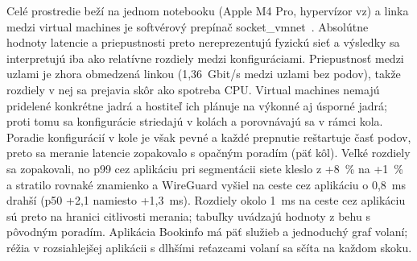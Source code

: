Celé prostredie beží na jednom notebooku (Apple M4 Pro, hypervízor vz) a linka medzi virtual machines je softvérový prepínač socket\_vmnet~\cite{socket-vmnet}. Absolútne hodnoty latencie a priepustnosti preto nereprezentujú fyzickú sieť a výsledky sa interpretujú iba ako relatívne rozdiely medzi konfiguráciami. Priepustnosť medzi uzlami je zhora obmedzená linkou (1,36~Gbit/s medzi uzlami bez podov), takže rozdiely v nej sa prejavia skôr ako spotreba CPU. Virtual machines nemajú pridelené konkrétne jadrá a hostiteľ ich plánuje na výkonné aj úsporné jadrá; proti tomu sa konfigurácie striedajú v kolách a porovnávajú sa v rámci kola. Poradie konfigurácií v kole je však pevné a každé prepnutie reštartuje časť podov, preto sa meranie latencie zopakovalo s opačným poradím (päť kôl). Veľké rozdiely sa zopakovali, no p99 cez aplikáciu pri segmentácii siete kleslo z +8~\% na +1~\% a stratilo rovnaké znamienko a WireGuard vyšiel na ceste cez aplikáciu o 0,8~ms drahší (p50 +2,1 namiesto +1,3~ms). Rozdiely okolo 1~ms na ceste cez aplikáciu sú preto na hranici citlivosti merania; tabuľky uvádzajú hodnoty z behu s pôvodným poradím. Aplikácia Bookinfo má päť služieb a jednoduchý graf volaní; réžia v rozsiahlejšej aplikácii s dlhšími reťazcami volaní sa sčíta na každom skoku.

